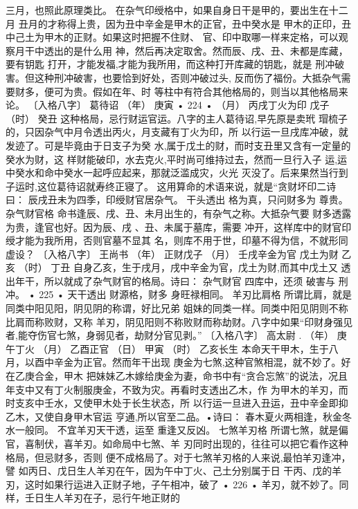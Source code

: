 三月，也照此原理类比。
在杂气印绶格中，如果自身日干是甲的，要出生在十二月
丑月的才称得上贵，因为丑中辛金是甲木的正官，丑中癸水是
甲木的正印，丑中己土为甲木的正财。如果这时把握不住财、
官、印中取哪一样来定格，可以观察月干中透出的是什么用
神，然后再决定取舍。然而辰、戌、丑、未都是库藏，要有钥匙
打开，才能发福,才能为我所用，而这种打开库藏的钥匙，就是
刑冲破害。但这种刑冲破害，也要恰到好处，否则冲破过头,
反而伤了福份。大抵杂气需要财多，便可为贵。假如在年、时
等柱中有符合其他格局的，则当以其他格局来论。
〔入格八字〕 葛待诏
（年） 庚寅
• 224 •
（月） 丙戌丁火为印
戊子
（时） 癸丑
这种格局，忌行财运官运。八字的主人葛待诏,早先原是卖玳
瑁梳子的，只因杂气中月令透出丙火，月支藏有丁火为印，所
以行运一旦戌库冲破，就发迹了。可是毕竟由于日支子为癸
水,属于戊土的财，而时支丑里又含有一定量的癸水为财，这
样财能破印，水去克火,平时尚可维持过去，然而一旦行入子
运,运中癸水和命中癸水一起呼应起来，那就泛滥成灾，火光
灭没了。后来果然当行到子运时,这位葛待诏就寿终正寝了。
这用算命的术语来说，就是“贪财坏印二诗曰：
辰戌丑未为四季，印绶财官居杂气。
干头透出 格为真，只问财多为 尊贵。
杂气财官格
命书逢辰、戌、丑、未月出生的，有杂气之称。大抵杂气要
财多透露为贵，逢官也好。因为辰、戌 、丑、未属于墓库，需要
冲开，这样库中的财官印绶才能为我所用，否则官墓不显其
名，则库不用于世，印墓不得为信，不就形同虚设？
〔入格八字〕 王尚书
（年） 正财戊子
（月） 壬戌辛金为官 戊土为财
乙亥
（时） 丁丑
自身乙亥，生于戌月，戌中辛金为官，戊土为财,而其中戊土又
透出年干，所以就成了杂气财官的格局。诗曰：
杂气财官 四库中，还须 破害与 刑冲。
• 225 •
天干透出 财源格，财多 身旺禄相同。
羊刃比肩格
所谓比肩，就是同类中阳见阳，阴见阴的称谓，好比兄弟
姐妹的同类一样。同类中阳见阴则不称比肩而称败财，又称
羊刃，阴见阳则不称败财而称劫财。八字中如果“印财身强见
者,能夺伤官七煞，身弱见者，劫财分官见剥。”
〔入格八字〕 高太尉 .
（年） 庚午丁火
（月） 乙酉正官
（日） 甲寅
（时） 乙亥长生
本命天干甲木，生于八月，以酉中辛金为正官。然而年干出现
庚金为七煞,这种官煞相混，就不妙了。好在乙庚合金，甲木
把妹妹乙木嫁给庚金为妻，命书中有“贪合忘煞”的说法，况且
年支中又有丁火制服庚金，不致为灾。再看时支透出乙木，作
为甲木的羊刃，而时支亥中壬水，又使甲木处于长生状态，所
以行运一旦进入丑运，丑中辛金即抑乙木，又使自身甲木官运
亨通,所以官至二品。•诗曰：
春木夏火两相逢，秋金冬水一般同。
不宜羊刃天干透，运至 重逢又反凶。
七煞羊刃格
所谓七煞，就是偏官，喜制伏，喜羊刃。如命局中七煞、羊
刃同时出现的，往往可以把它看作这种格局，但忌财多，否则
便不成格局了。对于七煞羊刃格的人来说,最怕羊刃逢冲，譬
如丙日、戊日生人羊刃在午，因为午中丁火、己土分别属于日
干丙、戊的羊刃，这时如果行运进入正财子地，子午相冲，破了
• 226 •
羊刃，就不妙了。同样，壬日生人羊刃在子，忌行午地正财的
